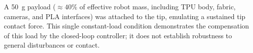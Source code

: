 A 50~g payload ($\approx 40\%$ of effective robot mass, including TPU body, fabric, cameras, and PLA interfaces) was attached to the tip, emulating a sustained tip contact force. This single constant-load condition demonstrates the compensation of this load by the closed-loop controller; it does not establish robustness to general disturbances or contact.
